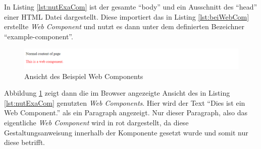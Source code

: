 \documentclass[12pt, paper=a4, bibtotoc, toc=listof, headsepline=true, numbers=endperiod]{scrreprt}
\begin{document}
In Listing \ref{lst:nutExaCom} ist der gesamte \enquote{body} und ein Ausschnitt des \enquote{head} einer \ac{HTML} Datei dargestellt. Diese importiert das in Listing \ref{lst:beiWebCom} erstellte \emph{Web Component} und nutzt es dann unter dem definierten Bezeichner \enquote{example-component}. 
	\begin{figure}				\centering
	\includegraphics[width=\textwidth,height=\textheight,keepaspectratio]{beiWebCom.png}
	\caption[Ansicht example-component]{Ansicht des Beispiel Web Components}
	\label{img:beiWebCom}
\end{figure}
Abbildung \ref{img:beiWebCom} zeigt dann die im Browser angezeigte Ansicht des in Listing \ref{lst:nutExaCom} genutzten \emph{Web Components}. Hier wird der Text \enquote{Dies ist ein Web Component.} als ein Paragraph angezeigt. Nur dieser Paragraph, also das eigentliche \emph{Web Component} wird in rot dargestellt, da diese Gestaltungsanweisung innerhalb der Komponente gesetzt wurde und somit nur diese betrifft. 
\end{document}
